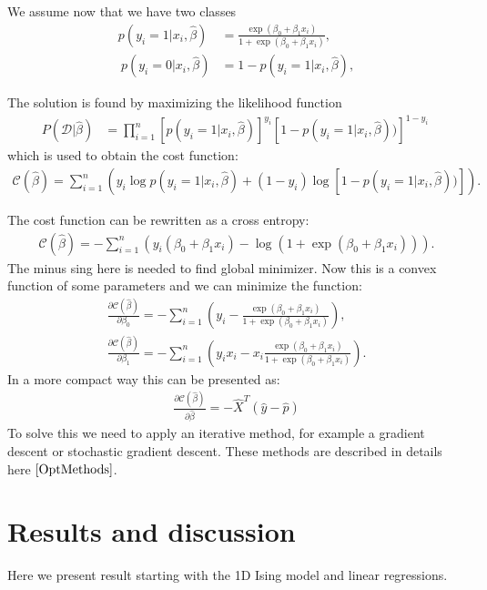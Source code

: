 \documentclass[10pt]{article}
\begin{document}
We assume now that we have two classes
 \begin{align} p(y_i=1|x_i,\hat{\beta}) &= \frac{\exp{(\beta_0+\beta_1x_i)}}{1+\exp{(\beta_0+\beta_1x_i)}}, \\\nonumber\ p(y_i=0|x_i,\hat{\beta}) &= 1 - p(y_i=1|x_i,\hat{\beta}), \end{align}

The solution is found by maximizing the likelihood function 
\begin{align} P(\mathcal{D}|\hat{\beta})& = \prod_{i=1}^n \left[p(y_i=1|x_i,\hat{\beta})\right]^{y_i}\left[1-p(y_i=1|x_i,\hat{\beta}))\right]^{1-y_i}\nonumber \ \end{align}
which is used to obtain the  cost function:
\begin{align}
\mathcal{C}(\hat{\beta}) = \sum_{i=1}^n \left( y_i\log{p(y_i=1|x_i,\hat{\beta})} + (1-y_i)\log\left[1-p(y_i=1|x_i,\hat{\beta}))\right]\right).
\end{align}

The cost function can be rewritten as a cross entropy:
\begin{align}
\mathcal{C}(\hat{\beta})=-\sum_{i=1}^n  \left(y_i(\beta_0+\beta_1x_i) -\log{(1+\exp{(\beta_0+\beta_1x_i)})}\right).
\end{align}
The minus sing here is needed to find global minimizer. Now this is a convex function of some parameters and we can minimize the function:
\begin{align}
\frac{\partial \mathcal{C}(\hat{\beta})}{\partial \beta_0} = -\sum_{i=1}^n  \left(y_i -\frac{\exp{(\beta_0+\beta_1x_i)}}{1+\exp{(\beta_0+\beta_1x_i)}}\right),\\
\frac{\partial \mathcal{C}(\hat{\beta})}{\partial \beta_1} = -\sum_{i=1}^n  \left(y_ix_i -x_i\frac{\exp{(\beta_0+\beta_1x_i)}}{1+\exp{(\beta_0+\beta_1x_i)}}\right).
\end{align}
In a more compact way this can be presented as:
\begin{align}\frac{\partial \mathcal{C}(\hat{\beta})}{\partial \hat{\beta}} = -\hat{X}^T\left(\hat{y}-\hat{p}\right)
\end{align}
To solve this we need to apply an iterative method, for example a gradient descent or stochastic gradient descent. These methods are described in details here $\cite{OptMethods}$.

\section{Results and discussion}
Here we present result starting with the 1D Ising model and linear regressions.
\end{document}
